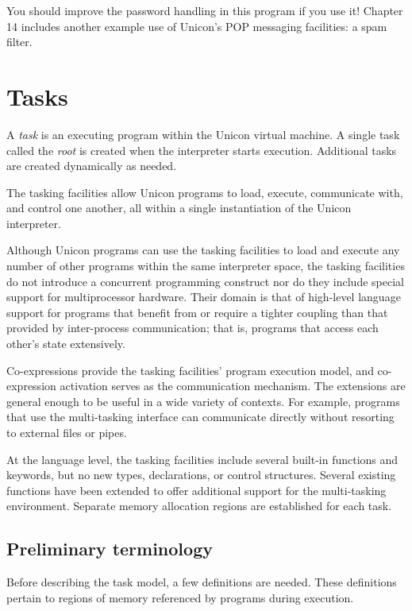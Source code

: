 \noindent
You should improve the password handling in this program if you use it!
Chapter 14 includes another example use of
Unicon's POP messaging facilities: a spam filter.

\section{Tasks}

A {\em task\/} is an executing program within the Unicon virtual
machine. A single task called the {\em root\/} is created
when the interpreter starts execution. Additional tasks are created
dynamically as needed.

The tasking facilities allow Unicon programs to load, execute,
communicate with, and control one another, all within a single
instantiation of the Unicon interpreter. 

Although Unicon programs can use the tasking facilities to load and
execute any number of other programs within the same interpreter space,
the tasking facilities do not introduce a concurrent programming
construct nor do they include special support for multiprocessor
hardware. Their domain is that of high-level language support for
programs that benefit from or require a tighter coupling than that
provided by inter-process communication; that is, programs that access
each other's state extensively.

Co-expressions provide the tasking facilities' program
execution model, and co-expression activation serves as the
communication mechanism. The extensions are general enough to be useful
in a wide variety of contexts. For example, programs that use the
multi-tasking interface can communicate directly without resorting to
external files or pipes.

At the language level, the tasking facilities include several
built-in functions and keywords, but no new types, declarations, or
control structures. Several existing functions have been extended to
offer additional support for the multi-tasking environment. 
Separate memory allocation regions are established for each task. 

\subsection*{Preliminary terminology}

Before describing the task model, a few definitions are needed. These
definitions pertain to regions of memory referenced by programs during
execution. 

